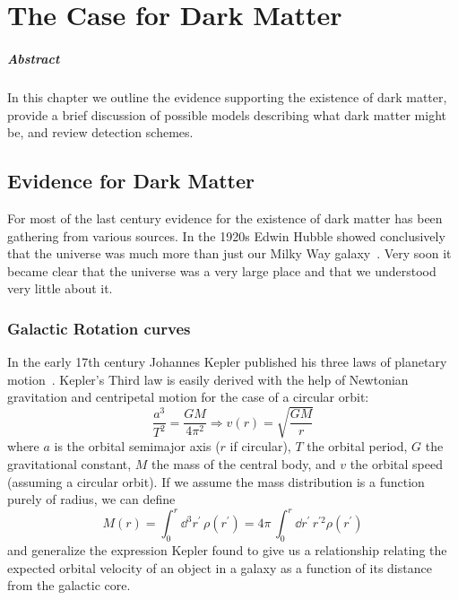 
\chapter{The Case for Dark Matter}

\paragraph{Abstract} In this chapter we outline the evidence supporting the existence of dark matter, provide a brief discussion of possible models describing what dark matter might be, and review detection schemes.

\section{Evidence for Dark Matter}

For most of the last century evidence for the existence of dark matter has been gathering from various sources. In the 1920s Edwin Hubble showed conclusively that the universe was much more than just our Milky Way galaxy~\cite{Hubble:1929}. Very soon it became clear that the universe was a very large place and that we understood very little about it.

\subsection{Galactic Rotation curves}

In the early 17th century Johannes Kepler published his three laws of planetary motion~\cite{Kepler}. Kepler's Third law is easily derived with the help of Newtonian gravitation and centripetal motion for the case of a circular orbit:
\begin{equation} \label{eq:rotation_curve}
\frac{a^3}{T^2} = \frac{GM}{4\pi^2} \Longrightarrow v(r) = \sqrt{\frac{GM}{r}}
\end{equation}
where $a$ is the orbital semimajor axis ($r$ if circular), $T$ the orbital period, $G$ the gravitational constant, $M$ the mass of the central body, and $v$ the orbital speed (assuming a circular orbit). If we assume the mass distribution is a function purely of radius, we can define
\begin{equation} \label{eq:mass_distribution}
M(r) = \int_0^r \dd^3r^{\prime}\, \rho (r^{\prime}) = 4\pi\,\int_0^r \dd r^{\prime}\, r^{\prime 2} \rho(r^{\prime})
\end{equation}
and generalize the expression Kepler found to give us a relationship relating the expected orbital velocity of an object in a galaxy as a function of its distance from the galactic core.

